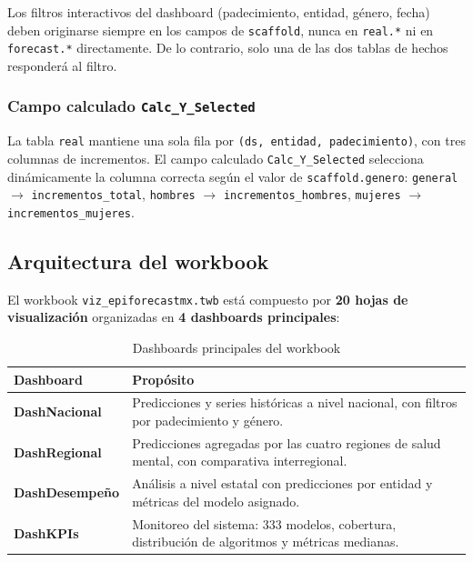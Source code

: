 \documentclass[12pt, letterpaper]{article}
\begin{document}
\begin{warningbox}
Los filtros interactivos del dashboard (padecimiento, entidad, género, fecha) deben originarse siempre en los campos de \texttt{scaffold}, nunca en \texttt{real.*} ni en \texttt{forecast.*} directamente. De lo contrario, solo una de las dos tablas de hechos responderá al filtro.
\end{warningbox}

\subsubsection{Campo calculado \texttt{Calc\_Y\_Selected}}

La tabla \texttt{real} mantiene una sola fila por \texttt{(ds, entidad, padecimiento)}, con tres columnas de incrementos. El campo calculado \texttt{Calc\_Y\_Selected} selecciona dinámicamente la columna correcta según el valor de \texttt{scaffold.genero}: \texttt{general} $\to$ \texttt{incrementos\_total}, \texttt{hombres} $\to$ \texttt{incrementos\_hombres}, \texttt{mujeres} $\to$ \texttt{incrementos\_mujeres}.

\newpage
\subsection{Arquitectura del workbook}\label{subsec:workbook}

El workbook \texttt{viz\_epiforecastmx.twb} está compuesto por \textbf{20 hojas de visualización} organizadas en \textbf{4 dashboards principales}:

\begin{table}[H]
\centering
\caption{Dashboards principales del workbook}
\label{tab:dashboards}
\small
\begin{tabularx}{\textwidth}{>{\bfseries}l X}
\toprule
\textbf{Dashboard} & \textbf{Propósito} \\
\midrule
DashNacional   & Predicciones y series históricas a nivel nacional, con filtros por padecimiento y género. \\
DashRegional   & Predicciones agregadas por las cuatro regiones de salud mental, con comparativa interregional. \\
DashDesempeño  & Análisis a nivel estatal con predicciones por entidad y métricas del modelo asignado. \\
DashKPIs       & Monitoreo del sistema: 333 modelos, cobertura, distribución de algoritmos y métricas medianas. \\
\bottomrule
\end{tabularx}
\end{table}
\end{document}

